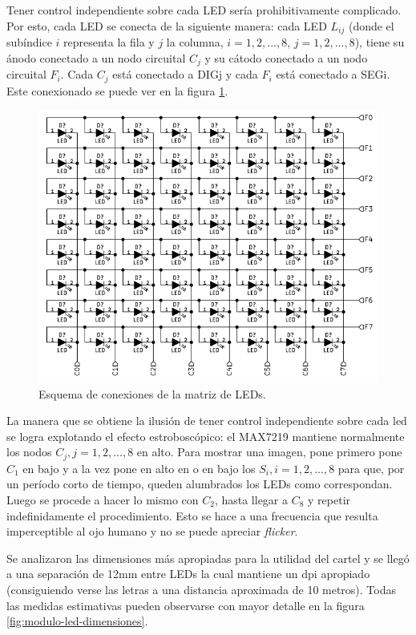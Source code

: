 Tener control independiente sobre cada LED sería prohibitivamente complicado. Por esto, cada LED se conecta de la siguiente manera: cada LED $L_{i j}$ (donde el subíndice $i$ representa la fila y $j$ la columna, $i=1, 2, ..., 8$, $j = 1,2, ..., 8$), tiene su ánodo conectado a un nodo circuital $C_j$ y su cátodo conectado a un nodo circuital $F_i$. Cada $C_j$ está conectado a DIGj y cada $F_i$ está conectado a SEGi. Este conexionado se puede ver en la figura \ref{fig:modulo-led}.

\begin{figure}[ht!]
	\centering
	\includegraphics[width=0.7\linewidth]{imagenes/hw/modulo-led.pdf}
	\caption{Esquema de conexiones de la matriz de LEDs.}
	\label{fig:modulo-led}
\end{figure}

La manera que se obtiene la ilusión de tener control independiente sobre cada led se logra explotando el efecto estroboscópico: el MAX7219 mantiene normalmente los nodos $C_j, j = 1, 2, ... ,8$ en alto. Para mostrar una imagen, pone primero pone $C_1$ en bajo y a la vez pone en alto en o en bajo los $S_i, i=1,2,...,8$ para que, por un período corto de tiempo, queden alumbrados los LEDs como correspondan. Luego se procede a hacer lo mismo con $C_2$, hasta llegar a $C_8$ y repetir indefinidamente el procedimiento. Esto se hace a una frecuencia que resulta imperceptible al ojo humano y no se puede apreciar \emph{flicker}.

Se analizaron las dimensiones más apropiadas para la utilidad del cartel y se llegó a una separación de 12mm entre LEDs la cual mantiene un dpi apropiado (consiguiendo verse las letras a una distancia aproximada de 10 metros). 
Todas las medidas estimativas pueden observarse con mayor detalle en la figura \ref{fig:modulo-led-dimensiones}.

